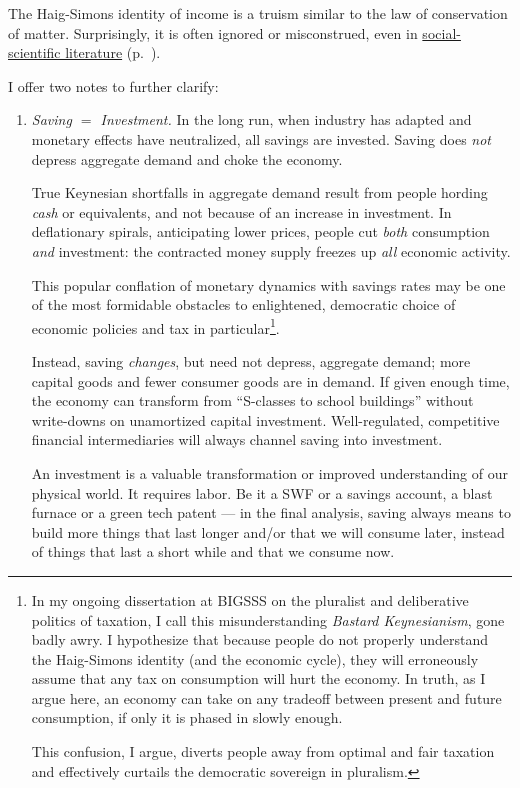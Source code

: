 The Haig-Simons identity of income is a truism similar to the law of conservation of matter. Surprisingly, it is often ignored or misconstrued, even in \hyperref[sec:Literature]{social-scientific literature} (p.~\pageref{sec:Literature}). %

I offer two notes to further clarify:
\begin{enumerate}
	\item \emph{Saving $=$ Investment.} In the long run, when industry has adapted and monetary effects have neutralized, all savings are invested. Saving does \emph{not} depress aggregate demand and choke the economy.
	
	True Keynesian shortfalls in aggregate demand result from people hording \emph{cash} or equivalents, and not because of an increase in investment. In deflationary spirals, anticipating lower prices, people cut \emph{both} consumption \emph{and} investment: the contracted money supply freezes up \emph{all} economic activity. 
	
	This popular conflation of monetary dynamics with savings rates may be one of the most formidable obstacles to enlightened, democratic choice of economic policies and tax in particular\footnote{
		In my ongoing dissertation at \gls{BIGSSS} on the pluralist and deliberative politics of taxation, I call this misunderstanding \emph{Bastard Keynesianism}, gone badly awry. I hypothesize that because people do not properly understand the Haig-Simons identity (and the economic cycle), they will erroneously assume that any tax on consumption will hurt the economy. In truth, as I argue here, an economy can take on any tradeoff between present and future consumption, if only it is phased in slowly enough.
		
		This confusion, I argue, diverts people away from optimal and fair taxation and effectively curtails the democratic sovereign in pluralism.}.
	
	Instead, saving \emph{changes}, but need not depress, aggregate demand; more capital goods and fewer consumer goods are in demand. If given enough time, the economy can transform from ``S-classes to school buildings'' without write-downs on unamortized capital investment. Well-regulated, competitive financial intermediaries will always channel saving into investment. 
	
	An investment is a valuable transformation or improved understanding of our physical world. It requires labor. Be it a \gls{SWF} or a savings account, a blast furnace or a green tech patent --- in the final analysis, saving always means to build more things that last longer and/or that we will consume later, instead of things that last a short while and that we consume now. 
	

\end{enumerate}
